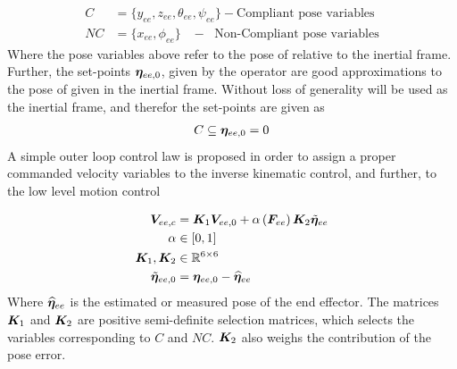 \begin{align*}
	C&=\{y_{ee},z_{ee},\theta_{ee},\psi_{ee}\} - \text{Compliant pose variables}
	\\
	NC&=\{x_{ee},\phi_{ee}\} \; \; \; - \; \text{ Non-Compliant pose variables}
\end{align*}
Where the pose variables above refer to the pose of  relative to the inertial frame. Further, the set-points $\boldsymbol \eta_{ee,0}$, given by the operator are good approximations to the pose of  given in the inertial frame. Without loss of generality  will be used as the inertial frame, and therefor the set-points are given as  
\begin{align}
C \subseteq	\boldsymbol \eta_{ee,0}=0
	\label{eq:subset}
\end{align}
A simple outer loop control law is proposed in order to assign a proper commanded velocity variables to the inverse kinematic control, and further, to the low level motion control

\begin{align}
	\boldsymbol V_{ee,c} &= \boldsymbol K_{1}\boldsymbol V_{ee,0} + \alpha \left( \boldsymbol F_{ee} \right) \boldsymbol K_{2} \tilde{\boldsymbol \eta}_{ee} 
	\label{eq:control_law1}
	\\
	\alpha &\in \left[ 0,1\right]
	\\
	\boldsymbol K_{1},\boldsymbol K_{2}&\in \mathbb{R}^{6 \times 6} \\
	\tilde{\boldsymbol \eta}_{ee,0}&= \boldsymbol \eta_{ee,0} - \widehat{\boldsymbol \eta}_{ee}
\end{align}
Where $\widehat{\boldsymbol \eta}_{ee}$ is the estimated or measured pose of the end effector. The matrices $\boldsymbol K_{1}$ and $ \boldsymbol K_{2}$ are positive semi-definite selection matrices, which selects the variables corresponding to $C$ and $NC$. $\boldsymbol K_{2}$ also weighs the contribution of the pose error.  

